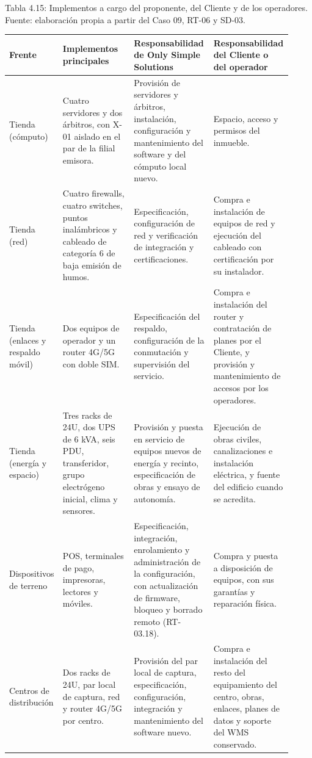\documentclass[11pt]{article}
\begin{document}
Tabla 4.15: Implementos a cargo del proponente, del Cliente y de los operadores. Fuente: elaboración propia a partir del Caso 09, RT-06 y SD-03.\par\nopagebreak
\begin{longtable}{@{}p{0.15\linewidth}p{0.25\linewidth}p{0.28\linewidth}p{0.24\linewidth}@{}}
\toprule Frente & Implementos principales & Responsabilidad de Only Simple Solutions & Responsabilidad del Cliente o del operador \\
\midrule\endhead\bottomrule\endlastfoot
Tienda (cómputo) & Cuatro servidores y dos árbitros, con X-01 aislado en el par de la filial emisora. & Provisión de servidores y árbitros, instalación, configuración y mantenimiento del software y del cómputo local nuevo. & Espacio, acceso y permisos del inmueble. \\
Tienda (red) & Cuatro firewalls, cuatro switches, puntos inalámbricos y cableado de categoría 6 de baja emisión de humos. & Especificación, configuración de red y verificación de integración y certificaciones. & Compra e instalación de equipos de red y ejecución del cableado con certificación por su instalador. \\
Tienda (enlaces y respaldo móvil) & Dos equipos de operador y un router 4G/5G con doble SIM. & Especificación del respaldo, configuración de la conmutación y supervisión del servicio. & Compra e instalación del router y contratación de planes por el Cliente, y provisión y mantenimiento de accesos por los operadores. \\
Tienda (energía y espacio) & Tres racks de 24U, dos UPS de 6 kVA, seis PDU, transferidor, grupo electrógeno inicial, clima y sensores. & Provisión y puesta en servicio de equipos nuevos de energía y recinto, especificación de obras y ensayo de autonomía. & Ejecución de obras civiles, canalizaciones e instalación eléctrica, y fuente del edificio cuando se acredita. \\
Dispositivos de terreno & POS, terminales de pago, impresoras, lectores y móviles. & Especificación, integración, enrolamiento y administración de la configuración, con actualización de firmware, bloqueo y borrado remoto (RT-03.18). & Compra y puesta a disposición de equipos, con sus garantías y reparación física. \\
Centros de distribución & Dos racks de 24U, par local de captura, red y router 4G/5G por centro. & Provisión del par local de captura, especificación, configuración, integración y mantenimiento del software nuevo. & Compra e instalación del resto del equipamiento del centro, obras, enlaces, planes de datos y soporte del WMS conservado. \\

\end{longtable}
\end{document}
